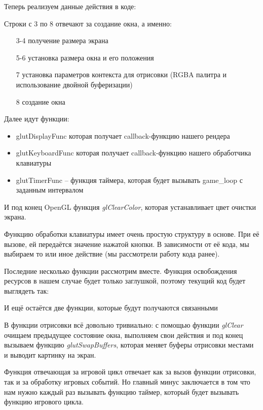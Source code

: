 Теперь реализуем данные действия в коде:


Строки с 3 по 8 отвечают за создание окна, а именно:
\begin{itemize}\itemsep-5pt
    \item[3-4] получение размера экрана
    \item[5-6] установка размера окна и его положения
    \item[7] установка параметров контекста для отрисовки 
        (RGBA палитра и использование двойной буферизации)
    \item[8] создание окна
\end{itemize}

Далее идут функции:
\begin{itemize}\itemsep-5pt
    \item glutDisplayFunc которая получает callback-функцию нашего рендера
    \item glutKeyboardFunc которая получает callback-функцию нашего обработчика клавиатуры
    \item glutTimerFunc -- функция таймера, которая будет вызывать game\_loop с заданным интервалом
\end{itemize}

И под конец OpenGL функция \emph{glClearColor}, которая устанавливает цвет очистки экрана.

Функцию обработки клавиатуры имеет очень простую структуру в основе. При её вызове, ей передаётся значение 
нажатой кнопки. В зависимости от её кода, мы выбираем то или иное действие (мы рассмотрели работу кода ранее).

Последние несколько функции рассмотрим вместе. Функция освобождения ресурсов в нашем случае будет только 
заглушкой, поэтому текущий код будет выглядеть так:


И ещё остаётся две функции, которые будут получаются связанными


В функции отрисовки всё довольно тривиально: с помощью функции \emph{glClear} очищаем предыдущее состояние 
окна, выполняем свои действия и под конец вызываем функцию \emph{glutSwapBuffers}, которая меняет буферы 
отрисовки местами и выводит картинку на экран.

Функция отвечающая за игровой цикл отвечает как за вызов функции отрисовки, так и за обработку игровых 
событий. Но главный минус заключается в том что нам нужно каждый раз вызывать функцию таймер, который 
будет вызывать функцию игрового цикла.

